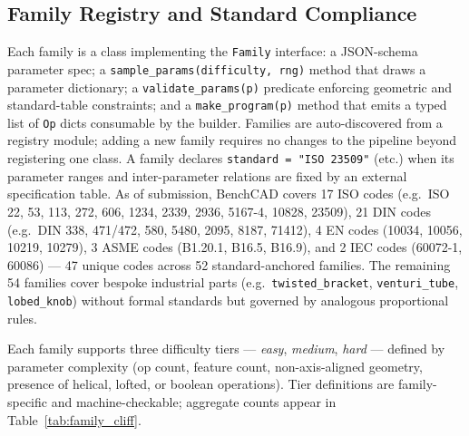 \documentclass{article}
\begin{document}
\subsection{Family Registry and Standard Compliance}
Each family is a class implementing the \texttt{Family} interface: a JSON-schema parameter spec; a \texttt{sample\_params(difficulty, rng)} method that draws a parameter dictionary; a \texttt{validate\_params(p)} predicate enforcing geometric and standard-table constraints; and a \texttt{make\_program(p)} method that emits a typed list of \texttt{Op} dicts consumable by the builder. Families are auto-discovered from a registry module; adding a new family requires no changes to the pipeline beyond registering one class. A family declares \texttt{standard = "ISO 23509"} (etc.) when its parameter ranges and inter-parameter relations are fixed by an external specification table. As of submission, BenchCAD covers 17 ISO codes (e.g.\ ISO 22, 53, 113, 272, 606, 1234, 2339, 2936, 5167-4, 10828, 23509), 21 DIN codes (e.g.\ DIN 338, 471/472, 580, 5480, 2095, 8187, 71412), 4 EN codes (10034, 10056, 10219, 10279), 3 ASME codes (B1.20.1, B16.5, B16.9), and 2 IEC codes (60072-1, 60086) --- 47 unique codes across 52 standard-anchored families. The remaining 54 families cover bespoke industrial parts (e.g.\ \texttt{twisted\_bracket}, \texttt{venturi\_tube}, \texttt{lobed\_knob}) without formal standards but governed by analogous proportional rules.

Each family supports three difficulty tiers --- \emph{easy}, \emph{medium}, \emph{hard} --- defined by parameter complexity (op count, feature count, non-axis-aligned geometry, presence of helical, lofted, or boolean operations). Tier definitions are family-specific and machine-checkable; aggregate counts appear in Table~\ref{tab:family_cliff}.
\end{document}
